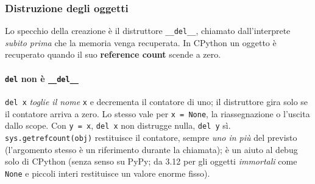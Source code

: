 \documentclass[a4paper,12pt]{article}
\begin{document}
\subsubsection{Distruzione degli oggetti}
Lo specchio della creazione è il distruttore \texttt{\_\_del\_\_}, chiamato dall'interprete
\emph{subito prima} che la memoria venga recuperata. In CPython un oggetto è recuperato quando
il suo \textbf{reference count} scende a zero.

\paragraph{\texttt{del} non è \texttt{\_\_del\_\_}} \texttt{del x} \emph{toglie il nome}
\texttt{x} e decrementa il contatore di uno; il distruttore gira solo se il contatore arriva a
zero. Lo stesso vale per \texttt{x = None}, la riassegnazione o l'uscita dallo scope. Con
\texttt{y = x}, \texttt{del x} non distrugge nulla, \texttt{del y} sì.
\texttt{sys.getrefcount(obj)} restituisce il contatore, sempre \emph{uno in più} del previsto
(l'argomento stesso è un riferimento durante la chiamata); è un aiuto al debug solo di CPython
(senza senso su PyPy; da 3.12 per gli oggetti \emph{immortali} come \texttt{None} e piccoli interi
restituisce un valore enorme fisso).
\end{document}

